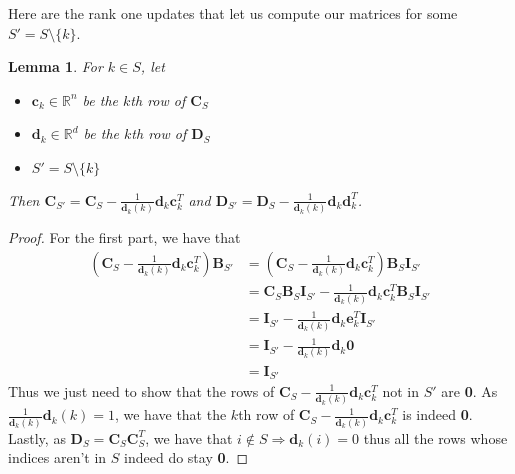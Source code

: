 \documentclass[12pt]{article}
\newtheorem{lemma}[theorem]{Lemma}
\begin{document}
Here are the rank one updates that let us compute our matrices for some $S'=S\setminus\{k\}$.
\begin{lemma}\label{update_lemma}
For $k\in S$, let 
\begin{itemize}
\item $\textbf{c}_k\in\mathbb{R}^{n}$ be the $k$th row of $\textbf{C}_S$
\item $\textbf{d}_k\in\mathbb{R}^{d}$ be the $k$th row of $\textbf{D}_S$
\item $S'= S\setminus\{k\}$
\end{itemize}
Then $\textbf{C}_{S'}=\textbf{C}_S-\frac{1}{\textbf{d}_k(k)}\textbf{d}_k\textbf{c}_k^T$ and $\textbf{D}_{S'}=\textbf{D}_S-\frac{1}{\textbf{d}_k(k)}\textbf{d}_k\textbf{d}_k^T$.
\end{lemma}
\begin{proof}
For the first part, we have that\begin{align*}
\left(\textbf{C}_S-\frac{1}{\textbf{d}_k(k)}\textbf{d}_k\textbf{c}_k^T\right)\textbf{B}_{S'}&=\left(\textbf{C}_S-\frac{1}{\textbf{d}_k(k)}\textbf{d}_k\textbf{c}_k^T\right)\textbf{B}_{S}\textbf{I}_{S'}\\
&=\textbf{C}_S\textbf{B}_S\textbf{I}_{S'}-\frac{1}{\textbf{d}_k(k)}\textbf{d}_k\textbf{c}_k^T\textbf{B}_{S}\textbf{I}_{S'}\\
&=\textbf{I}_{S'}-\frac{1}{\textbf{d}_k(k)}\textbf{d}_k\textbf{e}_k^T\textbf{I}_{S'}\\
&=\textbf{I}_{S'}-\frac{1}{\textbf{d}_k(k)}\textbf{d}_k\textbf{0}\\
&=\textbf{I}_{S'}\end{align*}
Thus we just need to show that the rows of $\textbf{C}_S-\frac{1}{\textbf{d}_k(k)}\textbf{d}_k\textbf{c}_k^T$ not in $S'$ are \textbf{0}. As $\frac{1}{\textbf{d}_k(k)}\textbf{d}_k(k)=1$, we have that the $k$th row of $\textbf{C}_S-\frac{1}{\textbf{d}_k(k)}\textbf{d}_k\textbf{c}_k^T$ is indeed \textbf{0}. Lastly, as $\textbf{D}_S=\textbf{C}_S\textbf{C}_S^T$, we have that $i\not\in S\Rightarrow \textbf{d}_k(i)=0$ thus all the rows whose indices aren't in $S$ indeed do stay \textbf{0}.


\end{proof}
\end{document}
